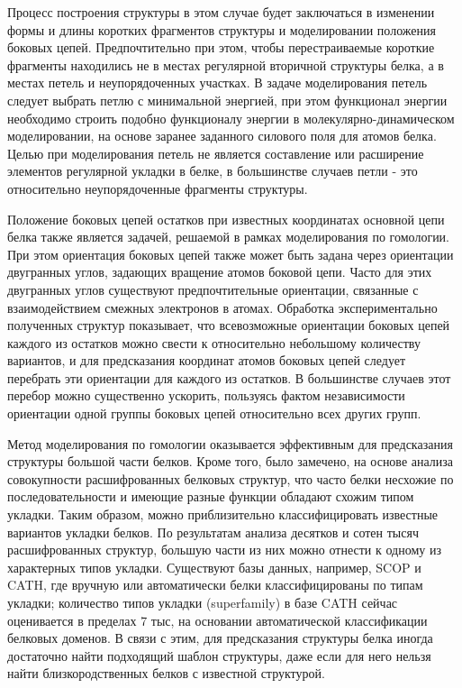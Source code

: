Процесс построения структуры в этом случае будет заключаться в изменении формы и длины коротких фрагментов структуры и моделировании положения боковых цепей. Предпочтительно при этом, чтобы перестраиваемые короткие фрагменты находились не в местах регулярной вторичной структуры белка, а в местах петель и неупорядоченных участках. 	В задаче моделирования петель следует выбрать петлю с минимальной энергией, при этом функционал энергии необходимо строить подобно функционалу энергии в молекулярно-динамическом моделировании, на основе заранее заданного силового поля для атомов белка. Целью при моделирования петель не является составление или расширение элементов регулярной укладки в белке, в большинстве случаев петли - это относительно неупорядоченные фрагменты структуры.

Положение боковых цепей остатков при известных координатах основной цепи белка также является задачей, решаемой в рамках моделирования по гомологии. При этом ориентация боковых цепей также может быть задана через ориентации двугранных углов, задающих вращение атомов боковой цепи. Часто для этих двугранных углов существуют предпочтительные ориентации, связанные с взаимодействием смежных электронов в атомах. Обработка экспериментально полученных структур показывает, что всевозможные ориентации боковых цепей каждого из остатков можно свести к относительно небольшому количеству вариантов, и для предсказания координат атомов боковых цепей следует перебрать эти ориентации для каждого из остатков. В большинстве случаев этот перебор можно существенно ускорить, пользуясь фактом независимости ориентации одной группы боковых цепей относительно всех других групп.

Метод моделирования по гомологии оказывается эффективным для предсказания структуры большой части белков. Кроме того, было замечено, на основе анализа совокупности расшифрованных белковых структур, что часто белки несхожие по последовательности и имеющие разные функции обладают схожим типом укладки. Таким образом, можно приблизительно классифицировать известные вариантов укладки белков. По результатам анализа десятков и сотен тысяч расшифрованных структур, большую части из них можно отнести к одному из характерных типов укладки. Существуют базы данных, например, SCOP и CATH, где вручную или автоматически белки классифицированы по типам укладки; количество типов укладки (superfamily) в базе CATH сейчас оценивается в пределах 7 тыс, на основании автоматической классификации белковых доменов. В связи с этим, для предсказания структуры белка иногда достаточно найти подходящий шаблон структуры, даже если  для него нельзя найти близкородственных белков с известной структурой.

